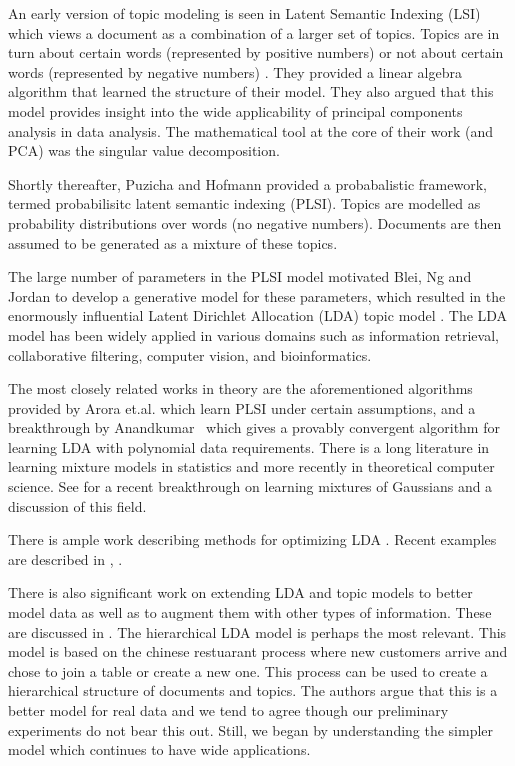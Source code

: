 An early version of topic modeling is seen in Latent Semantic
Indexing (LSI) which views a document as a combination of a larger
set of topics.  Topics are in turn about certain words
(represented by positive numbers) or not about certain words
(represented by negative numbers) \cite{Papadimitriou1997}.  They
provided a linear algebra algorithm that learned the structure
of their model.  They also argued that this model provides
insight into the wide applicability of principal
components analysis in data analysis. The mathematical tool at the core
of their work (and PCA) was the singular value
decomposition.

Shortly thereafter, Puzicha and Hofmann \cite{Hofmann04} provided a
probabalistic framework, termed probabilisitc latent
semantic indexing (PLSI). Topics are modelled as probability
distributions over words (no negative numbers). Documents are
then assumed to be generated as a mixture of these
topics. 

The large number of parameters in the PLSI model motivated
Blei, Ng and Jordan to develop a generative model for these parameters,
which resulted in the enormously influential Latent Dirichlet
Allocation (LDA) topic model \cite{Blei2003a}. The LDA model has been 
widely applied in various domains such as information
retrieval, collaborative filtering, computer vision, and bioinformatics.

The most closely related works in theory are the aforementioned
algorithms provided by Arora et.al. \cite{Arora2012} which learn PLSI
under certain assumptions, and a breakthrough by
Anandkumar~\cite{AnandLDA} which gives a provably convergent algorithm
for learning LDA with polynomial data requirements.  There is a long
literature in learning mixture models in statistics and
more recently in theoretical computer science. See
\cite{MoitraValiant} for a recent breakthrough on learning mixtures of
Gaussians and a discussion of this field.

There is ample work describing methods for optimizing
LDA \cite{BleiCACM}.  Recent examples are described
in \cite{McCallumMALLET}, \cite{BleiCBA}. 

There is also significant work on extending LDA and topic models to
better model data as well as to augment them with other types of
information.  These are discussed in \cite{BleiCACM}.  The
hierarchical LDA model \cite{BleiCM} is perhaps the most relevant.
This model is based on the chinese restuarant process where new
customers arrive and chose to join a table or create a new one.  This
process can be used to create a hierarchical structure of documents
and topics. The authors argue that this is a better model for real
data and we tend to agree though our preliminary experiments do not
bear this out.  Still, we began by understanding the simpler model
which continues to have wide applications.


